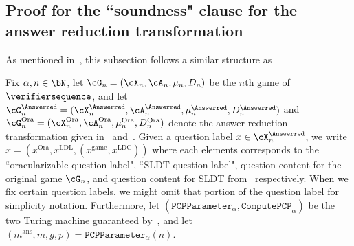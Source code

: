 \subsection{Proof for the ``soundness" clause for the answer reduction transformation}  \label{sec:ARsoundness}
As mentioned in~, this subsection follows a similar structure as~\cite[Section 10.7]{jiMIPRE2022a}

Fix $\alpha, n \in \bN$, let $\cG_n = (\cX_n, \cA_n,\mu_n, D_n)$ be the $n$th game of $\verifiersequence$, and let $\cG_n^{\Answerred} = (\cX_n^{\Answerred}, \cA_n^{\Answerred},\mu_n^{\Answerred}, D_n^{\Answerred})$ and $\cG_n^{\text{Ora}}  = (\cX_n^{\text{Ora}}, \cA_n^{\text{Ora}},\mu_n^{\text{Ora}}, D_n^{\text{Ora}})$ denote the answer reduction transformation given in~ and~. Given a question label $x \in \cX_n^{\Answerred}$, we write $x = (x^{\text{Ora}}, x^{\text{LDL}}, (x^{\text{game}},x^{\text{LDC}}))$ where each elements corresponds to the ``oracularizable question label", ``SLDT question label", question content for the original game $\cG_n$, and  question content for SLDT from~ respectively. When we fix certain question labels, we might omit that portion of the question label for simplicity notation. Furthermore, let $(\mathtt{PCPParameter}_{\alpha}, \mathtt{ComputePCP}_{\alpha})$ be the two Turing machine guaranteed by~, and let $(m^{\text{ans}},m, g, p) = \mathtt{PCPParameter}_{\alpha}(n)$. 

